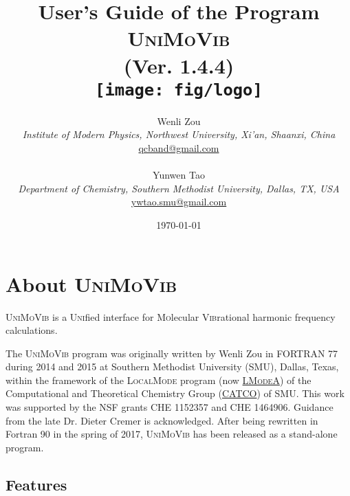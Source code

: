 \documentclass[12pt,english]{extarticle}
\begin{document}
\title{User's Guide of the Program \textsc{UniMoVib} \\
\vspace{10 mm} (Ver. 1.4.4) \vspace{30 mm} \\
\texttt{[image: fig/logo]} \vspace{30 mm} }

\date{\today}

\author{Wenli Zou \\
\textit{Institute of Modern Physics, Northwest University, Xi'an, Shaanxi, China} \\
\href{mailto:qcband@gmail.com}{qcband@gmail.com}
\\ \\
Yunwen Tao \\
\textit{Department of Chemistry, Southern Methodist University, Dallas, TX, USA} \\
\href{mailto:ywtao.smu@gmail.com}{ywtao.smu@gmail.com}
}

\maketitle
\setcounter{page}{0}
\thispagestyle{empty}

\pagebreak{}

\tableofcontents{}

\pagebreak{}

\section{About \textsc{UniMoVib}} \label{part:about}

\textsc{UniMoVib} is a \textsc{Uni}fied interface for \textsc{Mo}lecular \textsc{Vib}rational harmonic frequency calculations.

The \textsc{UniMoVib} program was originally written by Wenli Zou in FORTRAN 77 during 2014 and 2015 at Southern Methodist University (SMU), Dallas,
Texas, within the framework of the \textsc{LocalMode} program (now \href{https://sites.smu.edu/dedman/catco/}{\textsc{LModeA}}) of the Computational and Theoretical Chemistry Group (\href{https://sites.smu.edu/dedman/catco/}{CATCO}) of SMU. This work was
supported by the NSF grants CHE 1152357 and CHE 1464906. Guidance from the late Dr. Dieter Cremer is acknowledged. After being rewritten in Fortran 90 in the spring of 2017, \textsc{UniMoVib} has been released as a stand-alone program.

\subsection{Features} \label{sec:feature}
\end{document}

